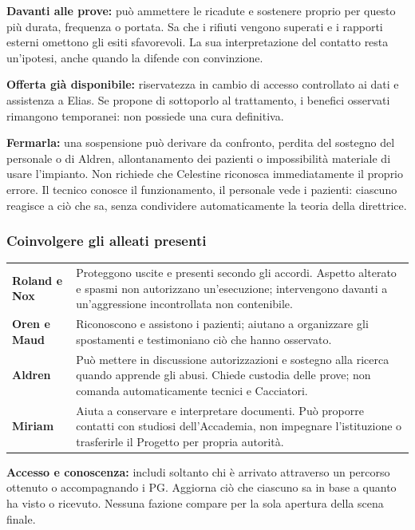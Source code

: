 \documentclass[11pt,a4paper]{article}
\begin{document}
\textbf{Davanti alle prove:} può ammettere le ricadute e sostenere proprio per questo più durata, frequenza o portata. Sa che i rifiuti vengono superati e i rapporti esterni omettono gli esiti sfavorevoli. La sua interpretazione del contatto resta un'ipotesi, anche quando la difende con convinzione.

\textbf{Offerta già disponibile:} riservatezza in cambio di accesso controllato ai dati e assistenza a Elias. Se propone di sottoporlo al trattamento, i benefici osservati rimangono temporanei: non possiede una cura definitiva.

\textbf{Fermarla:} una sospensione può derivare da confronto, perdita del sostegno del personale o di Aldren, allontanamento dei pazienti o impossibilità materiale di usare l'impianto. Non richiede che Celestine riconosca immediatamente il proprio errore. Il tecnico conosce il funzionamento, il personale vede i pazienti: ciascuno reagisce a ciò che sa, senza condividere automaticamente la teoria della direttrice.

\subsubsection{Coinvolgere gli alleati presenti}
\begin{tabularx}{\linewidth}{>{\bfseries}p{29mm} X}
Roland e Nox & Proteggono uscite e presenti secondo gli accordi. Aspetto alterato e spasmi non autorizzano un'esecuzione; intervengono davanti a un'aggressione incontrollata non contenibile.\\
Oren e Maud & Riconoscono e assistono i pazienti; aiutano a organizzare gli spostamenti e testimoniano ciò che hanno osservato.\\
Aldren & Può mettere in discussione autorizzazioni e sostegno alla ricerca quando apprende gli abusi. Chiede custodia delle prove; non comanda automaticamente tecnici e Cacciatori.\\
Miriam & Aiuta a conservare e interpretare documenti. Può proporre contatti con studiosi dell'Accademia, non impegnare l'istituzione o trasferirle il Progetto per propria autorità.\\
\end{tabularx}

\textbf{Accesso e conoscenza:} includi soltanto chi è arrivato attraverso un percorso ottenuto o accompagnando i PG. Aggiorna ciò che ciascuno sa in base a quanto ha visto o ricevuto. Nessuna fazione compare per la sola apertura della scena finale.
\end{document}
